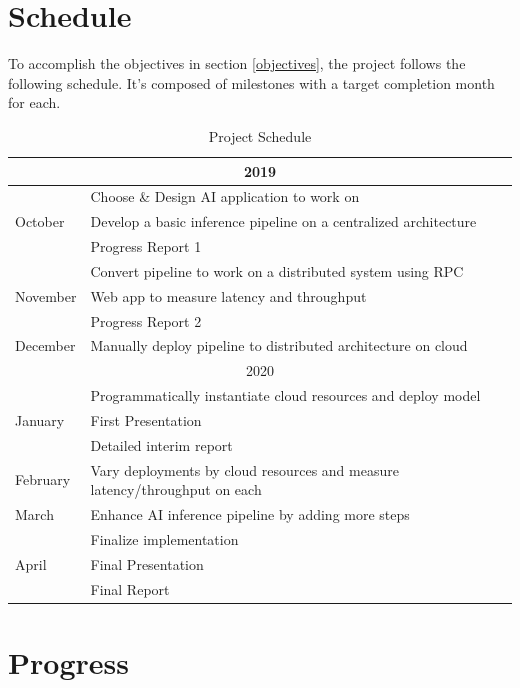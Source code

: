 \documentclass{report}
\begin{document}
\chapter{Schedule}\label{chap:schedule}
To accomplish the objectives in section \ref{objectives}, the project follows the following schedule. It's composed of milestones with a target completion month for each.
\begin{table}[h!]
  \begin{center}
    \caption{Project Schedule}
    \label{tab:table1}
    \begin{tabular}{ |l|l| } 
      \hline
      \multicolumn{2}{|c|}{2019} \\ \hline
      \multirow{3}{*}{October} & Choose \& Design AI application to work on \\
       & Develop a basic inference pipeline on a centralized architecture \\
       & Progress Report 1 \\ \hline
      \multirow{3}{*}{November} & Convert pipeline to work on a distributed system using RPC \\
       & Web app to measure latency and throughput \\
       & Progress Report 2 \\ \hline
      December & Manually deploy pipeline to distributed architecture on cloud \\ \hline
      \multicolumn{2}{|c|}{2020} \\ \hline
      \multirow{3}{*}{January} & Programmatically instantiate cloud resources and deploy model \\
       & First Presentation \\
       & Detailed interim report \\ \hline
      February     & Vary deployments by cloud resources and measure latency/throughput on each  \\ \hline
      March     & Enhance AI inference pipeline by adding more steps  \\ \hline
      \multirow{3}{*}{April} & Finalize implementation \\
       & Final Presentation \\
       & Final Report \\ \hline
      \end{tabular}
  \end{center}
\end{table}

\chapter{Progress}\label{chap:progress}
\end{document}
